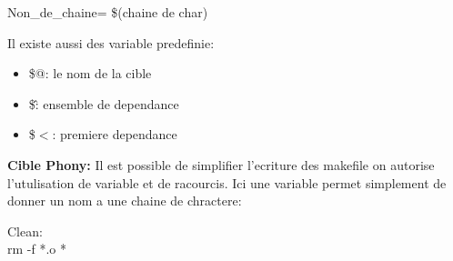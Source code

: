\documentclass[a4paper,11pt]{article}
\begin{document}
  \begin{center}
  \color{OrangeHaf}Non\_de\_chaine=\color{LightOrangeHaf} \$(chaine de char)\\
  \end{center}
  Il existe aussi des variable predefinie:
  \begin{itemize}
    \item \$@: le nom de la cible
    \item \$\^: ensemble de dependance
    \item \$$<$: premiere dependance
  \end{itemize}
  \textbf{Cible Phony:} Il est possible de simplifier l'ecriture des makefile on autorise l'utulisation de variable et de racourcis. Ici une variable permet simplement de donner un nom a une chaine de chractere:
  \begin{center}
    \color{OrangeHaf}Clean:\\
      \hspace{\parindent} \hspace{\parindent} \hspace{\parindent} \hspace{\parindent} \hspace{\parindent} \hspace{\parindent} \hspace{\parindent} \hspace{\parindent} \hspace{\parindent} \hspace{\parindent} \hspace{\parindent} \hspace{\parindent} \color{LightOrangeHaf} rm -f *.o *~
  \end{center}
\end{document}
